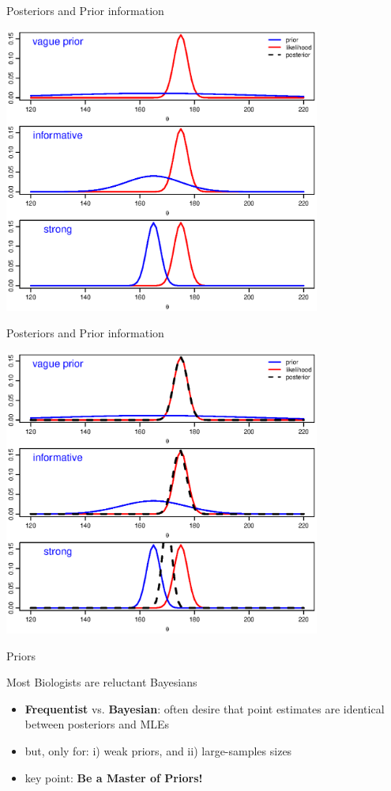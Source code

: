 \documentclass[presentation,9pt,xcolor=dvipsnames]{beamer}
\begin{document}
\begin{frame}[label={sec:org1293f49}]{Posteriors and Prior information}
\begin{center}
\includegraphics[width=0.78\textwidth,height=0.78\textheight]{priorinfro_2a.eps}
\end{center}
\end{frame}
\begin{frame}[label={sec:org4eef121}]{Posteriors and Prior information}
\begin{center}
\includegraphics[width=0.78\textwidth,height=0.78\textheight]{priorinfro_2b.eps}
\end{center}
\end{frame}
\begin{frame}[label={sec:orgb1a56d3}]{Priors}
\begin{block}{Most Biologists are reluctant Bayesians}
\begin{itemize}
\item \textbf{Frequentist} vs. \textbf{Bayesian}: often desire that point estimates are identical between posteriors and MLEs
\item \alert{but}, only for: i) weak priors, and ii) large-samples sizes
\item key point: \textbf{Be a Master of Priors!}
\end{itemize}
\end{block}
\end{frame}
\end{document}
